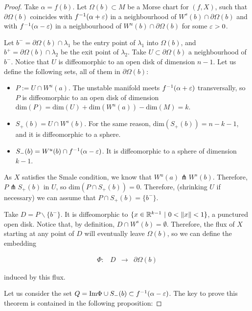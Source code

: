 \begin{proof}
Take $\alpha = f(b)$. Let $\Omega(b) \subset M$ be a Morse chart for $(f,X)$, such that $\partial\Omega(b)$ coincides with $f^{-1}(\alpha+\varepsilon)$ in a neighbourhood of $W^s(b) \cap \partial\Omega(b)$ and with $f^{-1}(\alpha-\varepsilon)$ in a neighbourhood of $W^u(b) \cap \partial\Omega(b)$ for some $\varepsilon > 0$.

Let $b^- = \partial\Omega(b) \cap \lambda_1$ be the entry point of $\lambda_1$ into $\Omega(b)$, and $b^+ = \partial\Omega(b) \cap \lambda_2$ be the exit point of $\lambda_2$. Take $U \subset \partial\Omega(b)$ a neighbourhood of $b^-$. Notice that $U$ is diffeomorphic to an open disk of dimension $n-1$. Let us define the following sets, all of them in $\partial\Omega(b)$:

\begin{itemize}
	\item $P := U \cap W^u(a)$. The unstable manifold meets $f^{-1}(\alpha+\varepsilon)$ transversally, so $P$ is diffeomorphic to an open disk of dimension $\text{dim}(P) = \text{dim}(U) + \text{dim}(W^u(a)) - \text{dim}(M) = k$.
	\item $S_+(b) = U \cap W^s(b)$. For the same reason, $\text{dim}(S_+(b)) = n - k - 1$, and it is diffeomorphic to a sphere.
	\item $S_-(b) = W^u(b) \cap f^{-1}(\alpha-\varepsilon)$. It is diffeomorphic to a sphere of dimension $k-1$.
\end{itemize}

As $X$ satisfies the Smale condition, we know that $W^u(a) \pitchfork W^s(b)$. Therefore, $P \pitchfork S_+(b)$ in $U$, so $\text{dim}(P \cap S_+(b)) = 0$. Therefore, (shrinking $U$ if necessary) we can assume that $P \cap S_+(b) = \{b^-\}$.

Take $D = P \backslash \{b^-\}$. It is diffeomorphic to $\{x \in \R^{k-1} \ | \ 0 < \|x\| < 1\}$, a punctured open disk. Notice that, by definition, $D \cap W^s(b) = \emptyset$. Therefore, the flux of $X$ starting at any point of $D$ will eventually leave $\Omega(b)$, so we can define the embedding

\[\begin{array}{rccc} \Phi : & D & \longrightarrow & \partial\Omega(b) \end{array}\]

induced by this flux.

Let us consider the set $Q = \text{Im} \Phi \cup S_-(b) \subset f^{-1}(\alpha-\varepsilon)$. The key to prove this theorem is contained in the following proposition:


\end{proof}
